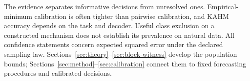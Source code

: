 The evidence separates informative decisions from unresolved ones.
Empirical-minimum calibration is often tighter than pairwise calibration,
and KAHM accuracy depends on the task and decoder. Useful class exclusion
on a constructed mechanism does not establish its prevalence on natural data.
All confidence statements concern expected squared error under the declared
sampling law. Sections~\ref{sec:theory}--\ref{sec:block-witness} develop the
population bounds; Sections~\ref{sec:method}--\ref{sec:calibration} connect them
to fixed forecasting procedures and calibrated decisions.
